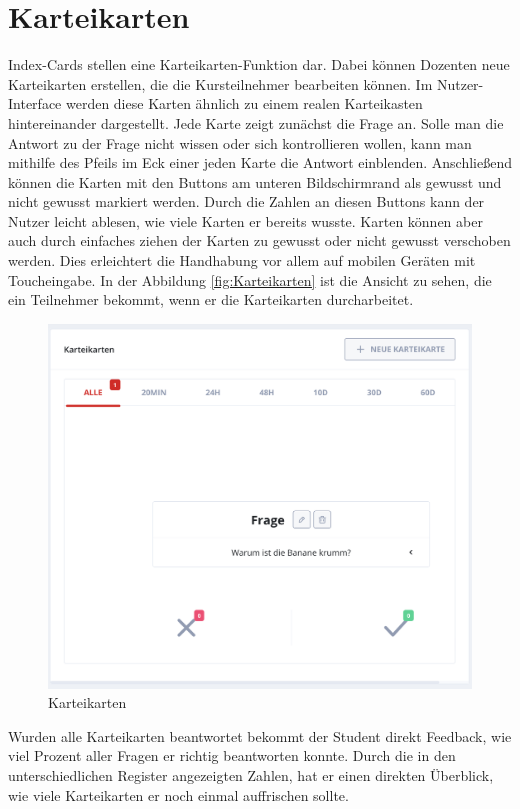 \section{Karteikarten}\label{sec:Karteikarten} %
Index-Cards stellen eine Karteikarten-Funktion dar. Dabei können Dozenten neue Karteikarten erstellen, die die Kursteilnehmer bearbeiten können.
Im Nutzer-Interface werden diese Karten ähnlich zu einem realen Karteikasten hintereinander dargestellt.
Jede Karte zeigt zunächst die Frage an.
Solle man die Antwort zu der Frage nicht wissen oder sich kontrollieren wollen, kann man mithilfe des Pfeils im Eck einer jeden Karte die Antwort einblenden.
Anschließend können die Karten mit den Buttons am unteren Bildschirmrand als gewusst und nicht gewusst markiert werden.
Durch die Zahlen an diesen Buttons kann der Nutzer leicht ablesen, wie viele Karten er bereits wusste.
Karten können aber auch durch einfaches ziehen der Karten zu gewusst oder nicht gewusst verschoben werden.
Dies erleichtert die Handhabung vor allem auf mobilen Geräten mit Toucheingabe. In der Abbildung \autoref{fig:Karteikarten} ist die Ansicht zu sehen, die ein Teilnehmer bekommt, wenn er die Karteikarten durcharbeitet.
\begin{figure}[h]
    \centering
    \includegraphics[width=.7\textwidth]{img/Karteikarten_hinzugefuegt.png}
    \caption{Karteikarten}
    \label{fig:Karteikarten}
\end{figure}

Wurden alle Karteikarten beantwortet bekommt der Student direkt Feedback, wie viel Prozent aller Fragen er richtig beantworten konnte. Durch die in den unterschiedlichen Register angezeigten Zahlen, hat er einen direkten Überblick, wie viele Karteikarten er noch einmal auffrischen sollte.



